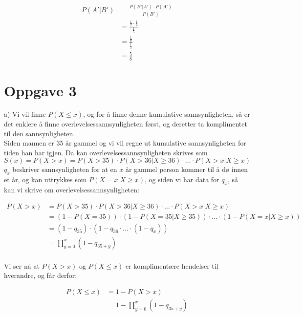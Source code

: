 \documentclass[12pt, a4paper]{article}
\begin{document}
\begin{equation}
    \begin{split}
        P(A' | B') &= \frac{P(B' | A') \cdot P(A')}{P(B')} \\
                   &= \frac{\frac{1}{2} \cdot \frac{1}{4}}{\frac{1}{5}} \\
                   &= \frac{\frac{1}{8}}{\frac{1}{5}} \\
                   &= \frac{5}{8}
    \end{split}
\end{equation}

\newpage

\section*{Oppgave 3}

a) 
Vi vil finne $P(X \leq x)$, og for å finne denne kumulative sannsynligheten, så er det enklere å finne overlevelsessannsynligheten først, og deretter
ta komplimentet til den sannsynligheten. \\
Siden mannen er 35 år gammel og vi vil regne ut kumulative sannsynligheten for tiden han har igjen. Da kan overlevelsessannsynligheten skrives som 
$S(x) = P(X > x) = P(X > 35) \cdot P(X > 36 | X \geq 36) \cdot \dots \cdot P(X > x | X \geq x)$
$q_x$ beskriver sannsynligheten for at en $x$ år gammel person kommer til å dø innen et år, og kan uttrykkes som $P(X = x | X \geq x)$,
og siden vi har data for $q_x$, så kan vi skrive om overlevelsessannsynligheten:

\begin{equation}
    \begin{split}
        P(X > x) &= P(X > 35) \cdot P(X > 36 | X \geq 36) \cdot \dots \cdot P(X > x | X \geq x) \\
                 &= (1 - P(X = 35)) \cdot (1 - P(X = 35 | X \geq 35)) \cdot \dots \cdot (1 - P(X = x | X \geq x)) \\
                 &= (1 - q_{35}) \cdot (1 - q_{36} \cdot \dots \cdot (1 - q_x)) \\
                 &= \prod_{y=0}^x (1 - q_{35+y}) \\
    \end{split}
\end{equation}

Vi ser nå at $P(X > x)$ og $P(X \leq x)$ er komplimentære hendelser til hverandre, og får derfor:

\begin{equation}
    \begin{split}
        P(X \leq x) &= 1 - P(X > x) \\
                    &= 1 - \prod_{y=0}^x (1 - q_{35+y})
    \end{split}
\end{equation}
\end{document}
